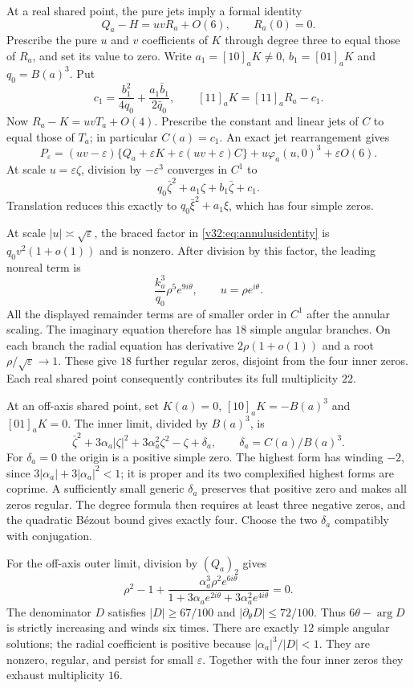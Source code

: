 \documentclass[UTF8,11pt]{ctexart}
\theoremstyle{definition}
\numberwithin{equation}{section}
\begin{document}
At a real shared point, the pure jets imply a formal identity
\[
 Q_a-H=uvR_a+O(6),\qquad R_a(0)=0.
\]
Prescribe the pure $u$ and $v$ coefficients of $K$ through
degree three to equal those of $R_a$, and set its value to zero.
Write $a_1=[10]_aK\ne0$, $b_1=[01]_aK$ and $q_0=B(a)^3$.
Put
\[
 c_1=\frac{b_1^2}{4q_0}
           +\frac{a_1\bar b_1}{2\bar q_0},\qquad
 [11]_aK=[11]_aR_a-c_1.
\]
Now $R_a-K=uvT_a+O(4)$. Prescribe the constant and linear
jets of $C$ to equal those of $T_a$; in particular $C(a)=c_1$.
An exact jet rearrangement gives
\begin{equation}\label{v32:eq:annulusidentity}
 P_\varepsilon=(uv-\varepsilon)
       \{Q_a+\varepsilon K+\varepsilon(uv+\varepsilon)C\}
       +u\varphi_a(u,0)^3+\varepsilon O(6).
\end{equation}
At scale $u=\varepsilon\zeta$, division by $-\varepsilon^3$
converges in $C^1$ to
\[
 q_0\bar\zeta^2+a_1\zeta+b_1\bar\zeta+c_1.
\]
Translation reduces this exactly to
$q_0\bar\xi^2+a_1\xi$, which has four simple zeros.

At scale $|u|\asymp\sqrt\varepsilon$, the braced factor in
\eqref{v32:eq:annulusidentity} is $q_0v^2(1+o(1))$ and
is nonzero. After division by this factor, the leading
nonreal term is
\[
 \frac{k_a^3}{q_0}\rho^5e^{9i\theta},
 \qquad u=\rho e^{i\theta}.
\]
All the displayed remainder terms are of smaller order in
$C^1$ after the annular scaling. The imaginary equation
therefore has $18$ simple angular branches. On each branch
the radial equation has derivative $2\rho(1+o(1))$ and a
root $\rho/\sqrt\varepsilon\to1$. These give $18$ further
regular zeros, disjoint from the four inner zeros. Each real
shared point consequently contributes its full multiplicity $22$.

At an off-axis shared point, set $K(a)=0$,
$[10]_aK=-B(a)^3$ and $[01]_aK=0$.
The inner limit, divided by $B(a)^3$, is
\[
 \bar\zeta^2+3\alpha_a|\zeta|^2
             +3\alpha_a^2\zeta^2-\zeta+\delta_a,
 \qquad \delta_a=C(a)/B(a)^3.
\]
For $\delta_a=0$ the origin is a positive simple zero.
The highest form has winding $-2$, since
$3|\alpha_a|+3|\alpha_a|^2<1$; it is proper and its two
complexified highest forms are coprime. A sufficiently small
generic $\delta_a$ preserves that positive zero and makes
all zeros regular. The degree formula then requires at least
three negative zeros, and the quadratic B\'ezout bound gives
exactly four. Choose the two $\delta_a$ compatibly with conjugation.

For the off-axis outer limit, division by $(Q_a)_2$ gives
\[
 \rho^2-1+
 \frac{\alpha_a^3\rho^2e^{6i\theta}}
 {1+3\alpha_ae^{2i\theta}+3\alpha_a^2e^{4i\theta}}=0.
\]
The denominator $D$ satisfies $|D|\ge67/100$ and
$|\partial_\theta D|\le72/100$. Thus
$6\theta-\arg D$ is strictly increasing and winds six times.
There are exactly $12$ simple angular solutions; the radial
coefficient is positive because $|\alpha_a|^3/|D|<1$.
They are nonzero, regular, and persist for small $\varepsilon$.
Together with the four inner zeros they exhaust multiplicity $16$.
\end{document}
